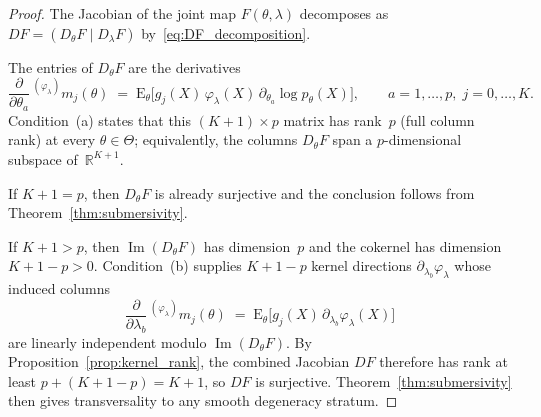 \documentclass[10pt,a4paper]{amsart}
\newcommand{\E}{\mathrm{E}}
\newcommand{\R}{\mathbb{R}}
\begin{document}
\begin{proof}
The Jacobian of the joint map $F(\theta,\lambda)$ decomposes as
$DF = (D_\theta F \mid D_\lambda F)$ by~\eqref{eq:DF_decomposition}.

The entries of $D_\theta F$ are the derivatives
\[
  \frac{\partial}{\partial\theta_a}\,
  {}^{(\varphi_\lambda)}\!m_j(\theta)
  \;=\;
  \E_\theta\!\bigl[
  g_j(X)\,\varphi_\lambda(X)\,
  \partial_{\theta_a}\log p_\theta(X)
  \bigr],
  \qquad a = 1,\ldots,p,\; j = 0,\ldots,K.
\]
Condition~(a) states that this $(K\!+\!1)\times p$ matrix has rank~$p$
(full column rank) at every $\theta \in \Theta$; equivalently, the
columns $D_\theta F$ span a $p$-dimensional subspace of~$\R^{K+1}$.

If $K+1 = p$, then $D_\theta F$ is already surjective and the
conclusion follows from Theorem~\ref{thm:submersivity}.

If $K+1 > p$, then $\operatorname{Im}(D_\theta F)$ has dimension~$p$
and the cokernel has dimension $K+1-p > 0$.  Condition~(b) supplies
$K+1-p$ kernel directions $\partial_{\lambda_b}\varphi_\lambda$
whose induced columns
\[
  \frac{\partial}{\partial\lambda_b}\,
  {}^{(\varphi_\lambda)}\!m_j(\theta)
  \;=\;
  \E_\theta\!\bigl[
  g_j(X)\,\partial_{\lambda_b}\varphi_\lambda(X)
  \bigr]
\]
are linearly independent modulo $\operatorname{Im}(D_\theta F)$.  By
Proposition~\ref{prop:kernel_rank}, the combined Jacobian $DF$
therefore has rank at least $p + (K+1-p) = K+1$, so $DF$ is
surjective.
Theorem~\ref{thm:submersivity} then gives transversality to any
smooth degeneracy stratum.
\end{proof}
\end{document}
